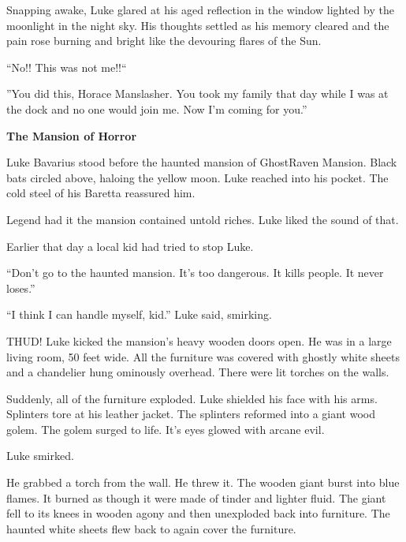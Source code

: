 Snapping awake, Luke glared at his aged reflection in the window
lighted by the moonlight in the night sky. His thoughts settled as
his memory cleared and the pain rose burning and bright like the
devouring flares of the Sun.

``No!! This was not me!!``



''You did this, Horace Manslasher. You took my family that day while
I was at the dock and no one would join me. Now I'm coming
for you.'' 
 





{\bf The Mansion of Horror}



Luke Bavarius stood before the haunted mansion of GhostRaven
Mansion. Black bats circled above, haloing the yellow moon. Luke
reached into his pocket. The cold steel of his Baretta reassured
him.



Legend had it the mansion contained untold riches. Luke liked the
sound of that.



Earlier that day a local kid had tried to stop Luke.

``Don't go to the haunted mansion. It's too
dangerous. It kills people. It never loses.''

``I think I can handle myself, kid.'' Luke said,
smirking.



THUD! Luke kicked the mansion's heavy wooden doors open. He
was in a large living room, 50 feet wide. All the furniture was
covered with ghostly white sheets and a chandelier hung ominously
overhead. There were lit torches on the walls.



Suddenly, all of the furniture exploded. Luke shielded his face
with his arms. Splinters tore at his leather jacket. The splinters
reformed into a giant wood golem. The golem surged to life.
It's eyes glowed with arcane evil.



Luke smirked.



He grabbed a torch from the wall. He threw it. The wooden giant
burst into blue flames. It burned as though it were made of tinder
and lighter fluid. The giant fell to its knees in wooden agony and
then unexploded back into furniture. The haunted white sheets flew
back to again cover the furniture.



